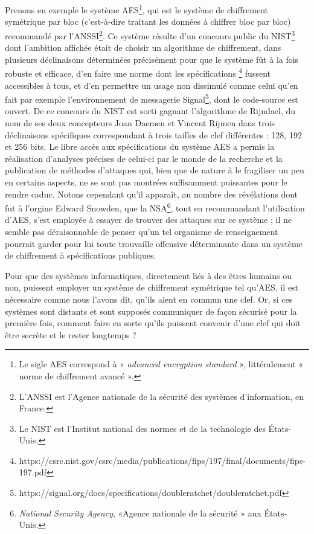 Prenons en exemple le système AES\footnote{Le sigle AES correspond à « \emph{advanced encryption
standard} », littéralement « norme de chiffrement avancé ».}, qui est le système de chiffrement
symétrique par bloc (c’est-à-dire traitant les données à chiffrer bloc par bloc) recommandé par
l’ANSSI\footnote{L’ANSSI est l’Agence nationale de la sécurité des systèmes d’information, en
France.}.
Ce système résulte d’un concours public du NIST\footnote{Le NIST est l’Institut national des normes
et de la technologie des États-Unis.} dont l’ambition affichée était de choisir un algorithme de
chiffrement, dans plusieurs déclinaisons déterminées précisément pour que le système fût à la fois
robuste et efficace, d’en faire une norme dont les spécifications%
\footnote{https://csrc.nist.gov/csrc/media/publications/fips/197/final/documents/fips-197.pdf}
fussent accessibles à tous, et d’en permettre un usage non dissimulé comme celui qu’en fait par
exemple l’environnement de messagerie
Signal\footnote{https://signal.org/docs/specifications/doubleratchet/doubleratchet.pdf}, dont le
code-source est ouvert.
De ce concours du NIST est sorti gagnant l’algorithme de Rijndael, du nom de ses deux concepteurs
Joan Daemen et Vincent Rijmen dans trois déclinaisons spécifiques correspondant à trois tailles de
clef différentes : 128, 192 et 256 bits. 
Le libre accès aux spécifications du système AES a permis la réalisation d’analyses précises de
celui-ci par le monde de la recherche et la publication de méthodes d’attaques qui, bien que de
nature à le fragiliser un peu en certains aspects, ne se sont pas montrées suffisamment
puissantes pour le rendre caduc.
Notons cependant qu’il apparaît, au nombre des révélations dont fut à l’orgine Edward Snowden, que
la NSA\footnote{\emph{National Security Agency}, «Agence nationale de la sécurité » aux États-Unis.},
tout en recommandant l’utilisation d’AES, s’est employée à essayer de trouver des attaques sur ce
système ; il ne semble pas déraisonnable de penser qu’un tel organisme de renseignement pourrait
garder pour lui toute trouvaille offensive déterminante dans un système de chiffrement à
spécifications publiques.

Pour que des systèmes informatiques, directement liés à des êtres humains ou non, puissent
employer un système de chiffrement symétrique tel qu’AES, il est nécessaire comme nous l’avons dit,
qu’ils aient en commun une clef.
Or, si ces systèmes sont distants et sont supposés communiquer de façon sécurisé pour la première
fois, comment faire en sorte qu’ils puissent convenir d’une clef qui doit être secrète et le rester
longtemps ?

